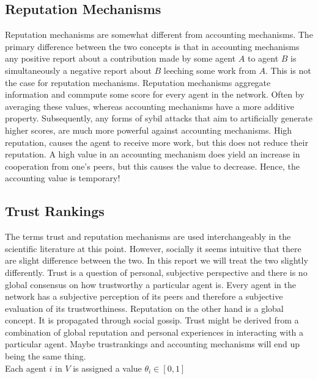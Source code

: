 \documentclass[11pt,a4paper]{report}
\theoremstyle{definition}
\theoremstyle{theorem}
\theoremstyle{proposition}
\theoremstyle{corollary}
\theoremstyle{lemma}
\theoremstyle{example}
\theoremstyle{remark}
\begin{document}
\subsection{Reputation Mechanisms}
\label{subsec:Reputation Mechanisms}
Reputation mechanisms are somewhat different from accounting mechanisms. The primary difference between the two concepts is that in accounting mechanisms any positive report about a contribution made by some agent $A$ to agent $B$ is simultaneously a negative report about $B$ leeching some work from $A$. This is not the case for reputation mechanisms. Reputation mechanisms aggregate information and commpute some score for every agent in the network. Often by averaging these values, whereas accounting mechanisms have a more additive property. Subsequently, any forms of sybil attacks that aim to artificially generate higher scores, are much more powerful against accounting mechanisms. High reputation, causes the agent to receive more work, but this does not reduce their reputation. A high value in an accounting mechanism does yield an increase in cooperation from one's peers, but this causes the value to decrease. Hence, the accounting value is temporary!
\subsection{Trust Rankings}
\label{subsec:Trust Rankings}
The terms trust and reputation mechanisms are used interchangeably in the scientific literature at this point. However, socially it seems intuitive that there are slight difference between the two. In this report we will treat the two slightly differently. Trust is a question of personal, subjective perspective and there is no global consensus on how trustworthy a particular agent is. Every agent in the network has a subjective perception of its peers and therefore a subjective evaluation of its trustworthiness. Reputation on the other hand is a global concept. It is propagated through social gossip. Trust might be derived from a combination of global reputation and personal experiences in interacting with a particular agent. Maybe trustrankings and accounting mechanisms will end up being the same thing.  \vspace{1em}\\

\noindent{} Each agent $i$ in $V$ is assigned a value $\theta_i\in{}[0,1]$ 
\end{document}
